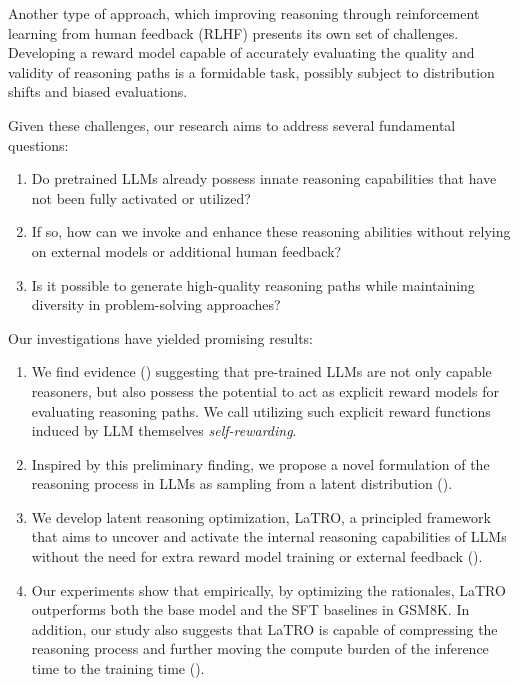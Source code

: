 Another type of approach, which improving reasoning through reinforcement learning from human feedback (RLHF) presents its own set of challenges. Developing a reward model capable of accurately evaluating the quality and validity of reasoning paths is a formidable task, possibly subject to distribution shifts and biased evaluations.

Given these challenges, our research aims to address several fundamental questions:
\begin{enumerate}
    \item Do pretrained LLMs already possess innate reasoning capabilities that have not been fully activated or utilized?
    \item If so, how can we invoke and enhance these reasoning abilities without relying on external models or additional human feedback?
    \item Is it possible to generate high-quality reasoning paths while maintaining diversity in problem-solving approaches? 
\end{enumerate}


Our investigations have yielded promising results:
\begin{enumerate}
    \item We find evidence () suggesting that pre-trained LLMs are not only capable reasoners, but also possess the potential to act as explicit reward models for evaluating reasoning paths. We call utilizing such explicit reward functions induced by LLM themselves \emph{self-rewarding}.
    \item Inspired by this preliminary finding, we propose a novel formulation of the reasoning process in LLMs as sampling from a latent distribution ().
    \item We develop latent reasoning optimization, LaTRO, a principled framework that aims to uncover and activate the internal reasoning capabilities of LLMs without the need for extra reward model training or external feedback ().
    \item Our experiments show that empirically, by optimizing the rationales, LaTRO outperforms both the base model and the SFT baselines in GSM8K. In addition, our study also suggests that LaTRO is capable of compressing the reasoning process and further moving the compute burden of the inference time to the training time (). \needsreview
\end{enumerate}

